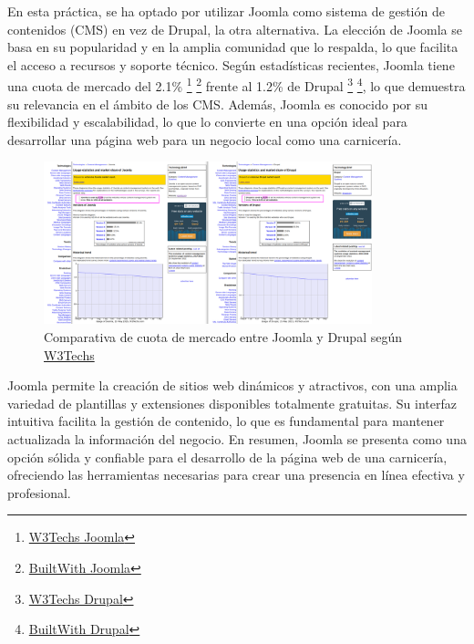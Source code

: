 \documentclass[a4paper]{article}
\newcommand{\textgap}{\vspace{1em}}
\begin{document}
En esta práctica, se ha optado por utilizar Joomla como sistema de gestión de contenidos (CMS) en vez de Drupal, la otra alternativa. La elección de Joomla se basa en su popularidad y en la amplia comunidad que lo respalda, lo que facilita el acceso a recursos y soporte técnico. Según estadísticas recientes, Joomla tiene una cuota de mercado del 2.1\% \footnote{\href{https://w3techs.com/technologies/details/cm-joomla}{W3Techs Joomla}} \footnote{\href{https://trends.builtwith.com/cms/Joomla!}{BuiltWith Joomla}} frente al 1.2\% de Drupal \footnote{\href{https://w3techs.com/technologies/details/cm-drupal}{W3Techs Drupal}} \footnote{\href{https://trends.builtwith.com/cms/Drupal}{BuiltWith Drupal}}, lo que demuestra su relevancia en el ámbito de los CMS. Además, Joomla es conocido por su flexibilidad y escalabilidad, lo que lo convierte en una opción ideal para desarrollar una página web para un negocio local como una carnicería.

\textgap

\begin{figure}[H]
    \centering
    \includegraphics[width=0.85\textwidth]{images/usage-stats.png}
    \caption{Comparativa de cuota de mercado entre Joomla y Drupal según \href{https://w3techs.com/technologies/overview/content_management}{W3Techs}}
\end{figure}

\textgap

Joomla permite la creación de sitios web dinámicos y atractivos, con una amplia variedad de plantillas y extensiones disponibles totalmente gratuitas. Su interfaz intuitiva facilita la gestión de contenido, lo que es fundamental para mantener actualizada la información del negocio. En resumen, Joomla se presenta como una opción sólida y confiable para el desarrollo de la página web de una carnicería, ofreciendo las herramientas necesarias para crear una presencia en línea efectiva y profesional.

\newpage
\end{document}
